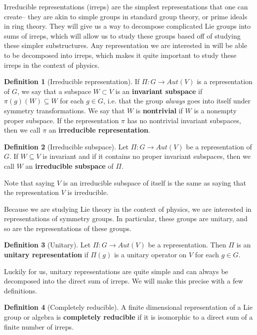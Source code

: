 \documentclass[11pt, oneside]{article}   	%
\theoremstyle{definition}
\newtheorem{definition}{Definition}[section]
\begin{document}
Irreducible representations (irreps) are the simplest representations that one can create-- they are 
akin to simple groups in standard group theory, or prime ideals in ring theory. They will give us a way 
to decompose complicated Lie groups into sums of irreps, which will allow us to study these groups based 
off of studying these simpler substructures. Any representation we are interested in will be able to be 
decomposed into irreps, which makes it quite important to study these irreps in the context of physics. 

\begin{definition}[Irreducible representation]
If $\Pi : G\rightarrow Aut(V)$ is a representation of $G$, we say that a subspace $W\subset V$ is 
an \textbf{invariant subspace} if $\pi(g)(W)\subseteq W$ for each $g\in G$, i.e. that the group 
\textit{always} goes into itself under symmetry transformations. We say that $W$ is \textbf{nontrivial} 
if $W$ is a nonempty proper subspace. If the representation $\pi$ has no nontrivial invariant subspaces, 
then we call $\pi$ an \textbf{irreducible representation}. 
\end{definition}

\begin{definition}[Irreducible subspace]
	Let $\Pi : G\rightarrow Aut(V)$ be a representation of $G$. If $W\subseteq V$ is invariant and if 
	it contains no proper invariant subspaces, then we call $W$ an \textbf{irreducible subspace} of 
	$\Pi$. 
\end{definition}

Note that saying $V$ is an irreducible subspace of itself is the same as saying that the representation $V$ 
is irreducible. 

Because we are studying Lie theory in the context of physics, we are interested in representations of 
symmetry groups. In particular, these groups are unitary, and so are the representations of these groups.
\begin{definition}[Unitary]
	Let $\Pi : G\rightarrow Aut(V)$ be a representation. Then $\Pi$ is an \textbf{unitary representation} if $\Pi(g)$ 
	is a unitary operator on $V$ for each $g\in G$. 
\end{definition}

Luckily for us, unitary representations are quite simple and can always be decomposed into the direct sum of irreps. 
We will make this precise with a few definitions.

\begin{definition}[Completely reducible]
	A finite dimensional representation of a Lie group or algebra is \textbf{completely reducible} if it is isomorphic 
	to a direct sum of a finite number of irreps. 
\end{definition}
\end{document}
